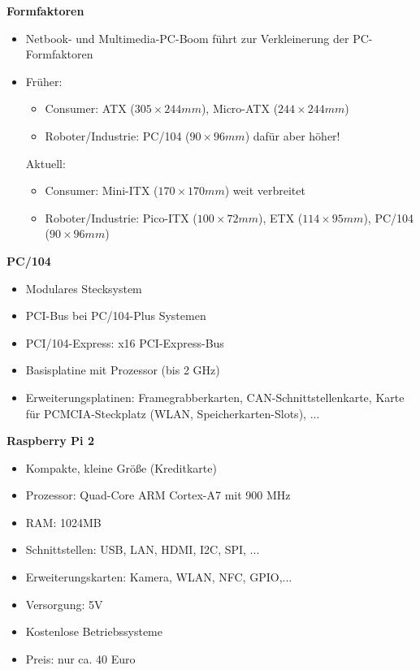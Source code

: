 \textbf{Formfaktoren}
\begin{itemize}
\item Netbook- und Multimedia-PC-Boom führt zur Verkleinerung der PC-Formfaktoren
\item Früher:
\begin{itemize}
\item Consumer: ATX ($305\times 244mm$), Micro-ATX ($244\times 244mm$)
\item Roboter/Industrie: PC/104 ($90\times 96mm$) dafür aber höher!
\end{itemize}
Aktuell:
\begin{itemize}
\item Consumer: Mini-ITX ($170\times 170mm$) weit verbreitet
\item Roboter/Industrie: Pico-ITX ($100\times 72mm$), ETX ($114\times 95mm$), PC/104 ($90\times 96mm$)
\end{itemize}
\end{itemize}
\textbf{PC/104}
\begin{itemize}
\item Modulares Stecksystem
\item PCI-Bus bei PC/104-Plus Systemen
\item PCI/104-Express: x16 PCI-Express-Bus
\item Basisplatine mit Prozessor (bis 2 GHz)
\item Erweiterungsplatinen: Framegrabberkarten, CAN-Schnittstellenkarte, Karte für PCMCIA-Steckplatz (WLAN, Speicherkarten-Slots), ...
\end{itemize}
\textbf{Raspberry Pi 2}
\begin{itemize}
\item Kompakte, kleine Größe (Kreditkarte)
\item Prozessor: Quad-Core ARM Cortex-A7 mit 900 MHz
\item RAM: 1024MB
\item Schnittstellen: USB, LAN, HDMI, I2C, SPI, ...
\item Erweiterungskarten: Kamera, WLAN, NFC, GPIO,...
\item Versorgung: 5V
\item Kostenlose Betriebssysteme
\item Preis: nur ca. 40 Euro
\end{itemize}

